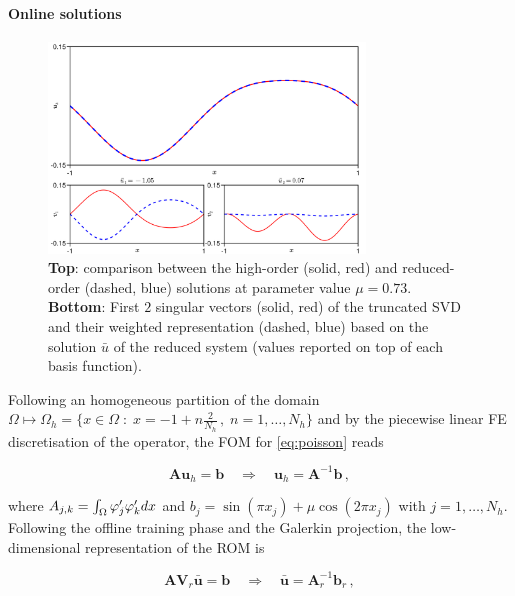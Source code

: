 \documentclass[../main.tex]{subfiles}
\begin{document}
\paragraph{Online solutions}\label{par:poisson_rom}

\begin{figure}[H]
    \centering 
    \includegraphics[keepaspectratio, width=0.75\textwidth]{../figures/fig:poisson_rom.png}
    \caption{\textbf{Top}: comparison between the high-order (solid, red) and reduced-order (dashed, blue) solutions at parameter value $\mu=0.73$.
    \textbf{Bottom}: First $2$ singular vectors (solid, red) of the truncated SVD and their weighted representation (dashed, blue) based on the solution $\bar{u}$ of the reduced system (values reported on top of each basis function).}
    \label{fig:poisson_rom}
\end{figure}

Following an homogeneous partition of the domain $\Omega\mapsto\Omega_{h} = \{x\in \Omega\;:\;x = -1 + n \frac{2}{N_{h}}\,,\;n=1,\dots,N_{h}\}$ and by the piecewise linear FE discretisation of the operator, the FOM for \eqref{eq:poisson} reads

\begin{equation*}
     \boldsymbol{A}\boldsymbol{u}_{h} = \boldsymbol{b}\quad\Rightarrow\quad \boldsymbol{u}_{h}=\boldsymbol{A}^{-1}\boldsymbol{b}\,,
\end{equation*}

where $A_{j,k} = \int_{\Omega}^{}\varphi_{j}'\varphi_{k}'dx$ and $b_{j} = \sin(\pi x_{j}) + \mu\cos(2\pi x_{j})$ with $j=1,\dots,N_{h}$.
Following the offline training phase and the Galerkin projection, the low-dimensional representation of the ROM is

\begin{equation*}
        \boldsymbol{A}\boldsymbol{V}_{r}\bar{\boldsymbol{u}} = \boldsymbol{b}\quad\Rightarrow\quad\bar{\boldsymbol{u}} = \boldsymbol{A}_{r}^{-1}\boldsymbol{b}_{r}\,,
\end{equation*}
\end{document}
